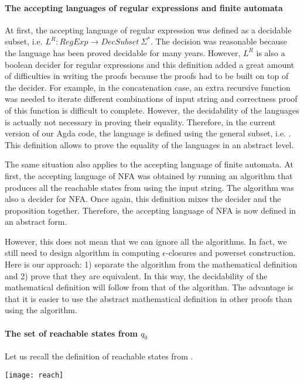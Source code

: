 \paragraph{The accepting languages of regular expressions and finite automata} At first, the
accepting language of regular expression was defined as a decidable
subset, i.e. \(L^R : RegExp \to DecSubset\ \Sigma^*\). The decision
was reasonable because the language has been proved decidable for many
years. However, \(L^R\) is also a boolean decider for regular
expressions and this definition added a great amount of
difficulties in writing the proofs because the proofs had to be built
on top of the decider. For example, in the concatenation case, an extra recursive
function was needed to iterate different combinations of input
string and correctness proof of this function is difficult to
complete. However, the decidability of the languages is actually not
necessary in proving their equality. Therefore, in the current version
of our Agda code, the language is defined using the general subset, i.e. . This definition allows to prove the equality of the languages
in an abstract level. 

\par The same situation also applies to the accepting language of finite automata. At first, the
accepting language of NFA was obtained by running an algorithm that
produces all the reachable states from \mb{q_0} using the input
string. The algorithm was also a decider for NFA. Once again, this
definition mixes the decider and the proposition together. Therefore,
the accepting language of NFA is now defined in an abstract form. 

\par However, this does not mean that we can ignore all the algorithms. In
fact, we still need to design algorithm in computing \(\epsilon\)-closures and
powerset construction. Here is our approach: 1) separate the algorithm from the
mathematical definition and 2) prove that they are equivalent. In this
way, the decidability of the mathematical definition will follow from that
of the algorithm. The advantage is that it is easier to use the
abstract mathematical definition in other proofs than using the algorithm. 

\paragraph{The set of reachable states from \(q_0\)} Let us recall the
definition of reachable states from \mb{q_0}. 
\begin{center} \texttt{[image: reach]} \end{center}

